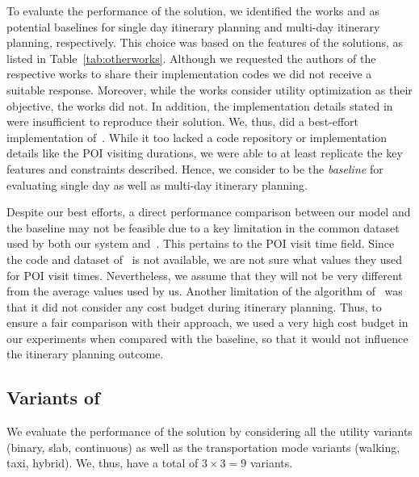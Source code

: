 To evaluate the performance of the \trip solution, we identified the works \cite{bolzoni2014efficient,taylor2018tour} and \cite{chen2014automatic,vanzelst2016itinerary} as potential baselines for single day itinerary planning and multi-day itinerary planning, respectively. This choice was based on the features of the solutions, as listed in Table~\ref{tab:otherworks}. Although we requested the authors of the respective works to share their implementation codes we did not receive a suitable response. Moreover, while the works \cite{bolzoni2014efficient,taylor2018tour}  consider utility optimization as their objective, the works \cite{chen2014automatic,vanzelst2016itinerary} did not. In addition, the implementation details stated in \cite{bolzoni2014efficient} were insufficient to reproduce their solution.  We, thus, did a best-effort implementation of~\cite{taylor2018tour}. While it too lacked a code repository or implementation details like the POI visiting durations, we were able to at least replicate the key features and constraints described. 
Hence, we consider \cite{taylor2018tour} to be the  \emph{baseline} for evaluating single day as well as multi-day itinerary planning.

Despite our best efforts, a direct performance comparison between our model and the baseline may not be
feasible due to a key limitation in the common dataset used by both our
system and~\cite{taylor2018tour}.
This pertains to the POI visit time field.
Since the code and dataset of~\cite{taylor2018tour} is not available, we are not sure what values they used for POI visit times.
Nevertheless, we assume that they will not be very different from the average values used by us.
Another limitation of the algorithm of~\cite{taylor2018tour} was that it did not consider any cost budget during
itinerary planning.
Thus, to ensure a fair comparison with their approach, we used a very
high cost budget in our experiments when compared with the baseline, so that
it would not influence the itinerary planning outcome.

\subsection{Variants of \trip}

We evaluate the performance of the \trip solution by considering all the utility variants (binary, slab, continuous) as well as the transportation mode variants (walking, taxi, hybrid). We, thus, have a total of $3 \times 3 = 9$ \trip variants.

